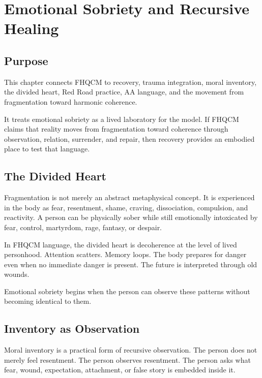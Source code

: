 \chapter{Emotional Sobriety and Recursive Healing}

\section{Purpose}

This chapter connects FHQCM to recovery, trauma integration, moral inventory, the divided heart, Red Road practice, AA language, and the movement from fragmentation toward harmonic coherence.

It treats emotional sobriety as a lived laboratory for the model. If FHQCM claims that reality moves from fragmentation toward coherence through observation, relation, surrender, and repair, then recovery provides an embodied place to test that language.


\section{The Divided Heart}

Fragmentation is not merely an abstract metaphysical concept. It is experienced in the body as fear, resentment, shame, craving, dissociation, compulsion, and reactivity. A person can be physically sober while still emotionally intoxicated by fear, control, martyrdom, rage, fantasy, or despair.

In FHQCM language, the divided heart is decoherence at the level of lived personhood. Attention scatters. Memory loops. The body prepares for danger even when no immediate danger is present. The future is interpreted through old wounds.

Emotional sobriety begins when the person can observe these patterns without becoming identical to them.

\section{Inventory as Observation}

Moral inventory is a practical form of recursive observation. The person does not merely feel resentment. The person observes resentment. The person asks what fear, wound, expectation, attachment, or false story is embedded inside it.

